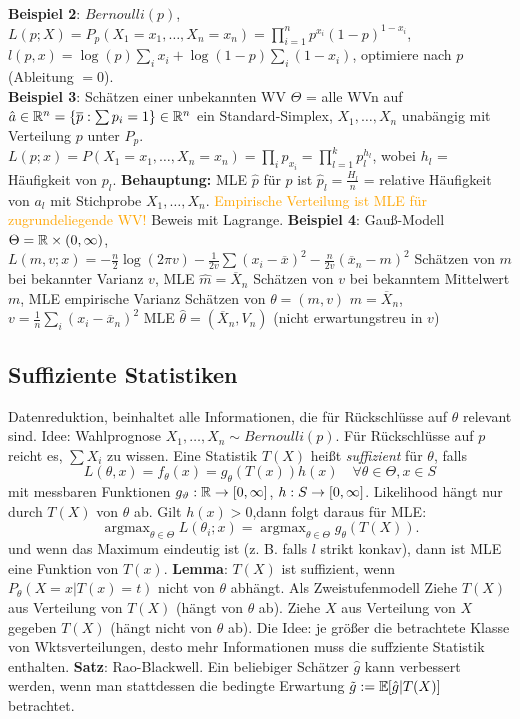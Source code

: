 \begin{outline}
    \1 \textbf{Beispiel 2}: $Bernoulli(p)$, $L(p;X)=P_p(X_1=x_1,\ldots,X_n=x_n)=\prod_{i=1}^n p^{x_i}(1-p)^{1-x_i}$, 
        \2 $l(p,x)=\log(p)\sum_i x_i + \log(1-p)\sum_i(1-x_i)$, optimiere nach $p$ (Ableitung $=0$).\\
    \1 \textbf{Beispiel 3}: Schätzen einer unbekannten WV
        \2 $\Theta$ = alle WVn auf $\hat{a}\in\mathbb{R}^n = \{\overline{p}:\sum p_i = 1\} \in \mathbb{R}^n$ ein Standard-Simplex, $X_1,\ldots,X_n$ unabängig mit Verteilung $p$ unter $P_p$. \2 $L(p;x)=P(X_1=x_1,\ldots,X_n=x_n)=\prod_i p_{x_i} = \prod_{l=1}^k p_l^{h_l}$, wobei $h_l$ = Häufigkeit von $p_l$.
        \2 \textbf{Behauptung:} MLE $\hat{p}$ für $p$ ist $\hat{p}_l= \frac{H_l}{n}$ = relative Häufigkeit von $a_l$ mit Stichprobe $X_1,\ldots,X_n$. \textcolor{orange}{Empirische Verteilung ist MLE für zugrundeliegende WV!} Beweis mit Lagrange.
    \1 \textbf{Beispiel 4}: Gauß-Modell
        \2 $\Theta = \mathbb{R} \times (0,\infty)$, 
        \2 $L(m,v;x)=-\frac{n}{2}\log(2\pi v) - \frac{1}{2v}\sum(x_i-\overline{x})^2 - \frac{n}{2v}(\overline{x}_n-m)^2$
        \2 Schätzen von $m$ bei bekannter Varianz $v$, MLE $\hat{m}=\overline{X}_n$
        \2 Schätzen von $v$ bei bekanntem Mittelwert $m$, MLE empirische Varianz
        \2 Schätzen von $\theta=(m,v)$
            \3 $m=\overline{X}_n$, $v=\frac{1}{n}\sum_i(x_i-\overline{x}_n)^2$
            \3 MLE $\hat{\theta}=(\overline{X}_n,V_n)$ (nicht erwartungstreu in $v$)
\end{outline}

\subsection{Suffiziente Statistiken}

\begin{outline}
\0 Datenreduktion, beinhaltet alle Informationen, die für Rückschlüsse auf $\theta$ relevant sind. Idee: Wahlprognose $X_1,\ldots,X_n \sim Bernoulli(p)$. Für Rückschlüsse auf $p$ reicht es, $\sum X_i$ zu wissen.
    \1 Eine Statistik $T(X)$ heißt \emph{suffizient} für $\theta$, falls $$L(\theta,x)=f_\theta(x)=g_\theta(T(x))h(x) \quad\forall \theta \in \Theta, x\in S$$ 
    mit messbaren Funktionen $g_\vartheta:\mathbb{R}\rightarrow [0,\infty]$, $h:S\rightarrow[0,\infty]$. Likelihood hängt nur durch $T(X)$ von $\theta$ ab.
    \1 Gilt $h(x)>0$,dann folgt daraus für MLE: $$\operatorname{argmax}_{\theta\in\Theta} L(\theta_i;x)=\operatorname{argmax}_{\theta\in\Theta}g_\theta(T(X)).$$
    und wenn das Maximum eindeutig ist (z. B. falls $l$ strikt konkav), dann ist MLE eine Funktion von $T(x)$.
    \1 \textbf{Lemma}: $T(X)$ ist suffizient, wenn $P_\theta(X=x|T(x)=t)$ nicht von $\theta$ abhängt.
    \1 Als Zweistufenmodell
        \2 Ziehe $T(X)$ aus Verteilung von $T(X)$ (hängt von $\theta$ ab).
        \2 Ziehe $X$ aus Verteilung von $X$ gegeben $T(X)$ (hängt nicht von $\theta$ ab). 
\0 Die Idee: je größer die betrachtete Klasse von Wktsverteilungen, desto mehr Informationen muss die suffziente Statistik enthalten.
    \1 \textbf{Satz}: Rao-Blackwell. Ein beliebiger Schätzer $\hat{g}$ kann verbessert werden, wenn man stattdessen die bedingte Erwartung $\Tilde{g}:=\mathbb{E}\hspace{-2pt}\left[{\hat{g}|T(X)}\right]$ betrachtet. 
\end{outline}

